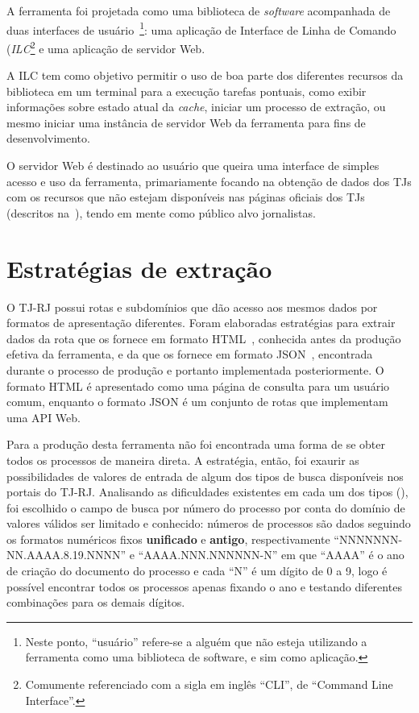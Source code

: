 A ferramenta foi projetada como uma biblioteca de \textit{software} acompanhada
de duas interfaces de usuário~\footnote{Neste ponto, ``usuário'' refere-se a
alguém que não esteja utilizando a ferramenta como uma biblioteca de software,
e sim como aplicação.}: uma aplicação de Interface de Linha de Comando
(\textit{ILC}\footnote{Comumente referenciado com a sigla em inglês ``CLI'', de
``Command Line Interface''.} e uma aplicação de servidor Web.

A ILC tem como objetivo permitir o uso de boa parte dos diferentes recursos da
biblioteca em um terminal para a execução tarefas pontuais, como exibir
informações sobre estado atual da \textit{cache}, iniciar um processo de
extração, ou mesmo iniciar uma instância de servidor Web da ferramenta para
fins de desenvolvimento.

O servidor Web é destinado ao usuário que queira uma interface de simples
acesso e uso da ferramenta, primariamente focando na obtenção de dados dos TJs
com os recursos que não estejam disponíveis nas páginas oficiais dos TJs
(descritos na~), tendo em mente como público alvo
jornalistas.

\section{Estratégias de extração}

O TJ-RJ possui rotas e subdomínios que dão acesso aos mesmos dados por formatos
de apresentação diferentes. Foram elaboradas estratégias para extrair dados da
rota que os fornece em formato HTML~,
conhecida antes da produção efetiva da ferramenta, e da que os fornece em
formato JSON~, encontrada durante o processo
de produção e portanto implementada posteriormente. O formato HTML é
apresentado como uma página de consulta para um usuário comum, enquanto o
formato JSON é um conjunto de rotas que implementam uma API Web.

Para a produção desta ferramenta não foi encontrada uma forma de se obter todos
os processos de maneira direta. A estratégia, então, foi exaurir as
possibilidades de valores de entrada de algum dos tipos de busca disponíveis
nos portais do TJ-RJ. Analisando as dificuldades existentes em cada um dos
tipos (), foi escolhido o campo de busca
por número do processo por conta do domínio de valores válidos ser limitado e
conhecido: números de processos são dados seguindo os formatos numéricos fixos
\textbf{unificado} e \textbf{antigo}, respectivamente
``NNNNNNN-NN.AAAA.8.19.NNNN'' e ``AAAA.NNN.NNNNNN-N'' em que ``AAAA'' é o ano
de criação do documento do processo e cada ``N'' é um dígito de 0 a 9, logo é
possível encontrar todos os processos apenas fixando o ano e testando
diferentes combinações para os demais dígitos.


